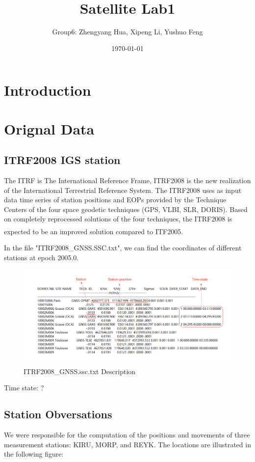 \documentclass{article}
\title{Satellite Lab1}
\author{Group6: Zhengyang Hua, Xipeng Li, Yushuo Feng}
\date{\today}
\newcommand{\upcite}[1]{\textsuperscript{\textsuperscript{\cite{#1}}}}
\begin{document}
\maketitle

\section{Introduction}


\section{Orignal Data}
\subsection{ITRF2008 IGS station}
The ITRF is The International Reference Frame, 
ITRF2008 is the new realization of the International Terrestrial Reference System. 
The ITRF2008 uses as input data time series of station positions and EOPs provided by the Technique Centers of the four space geodetic techniques (GPS, VLBI, SLR, DORIS). 
Based on completely reprocessed solutions of the four techniques, the ITRF2008 is expected to be an improved solution compared to ITF2005\upcite{ref1}.

In the file "ITRF2008\_GNSS.SSC.txt", we can find the coordinates of different stations at epoch 2005.0.
\begin{figure}[htbp]
    \centering
    \includegraphics[width=12cm]{./source/ITRF2008.png}
    \caption{ITRF2008\_GNSS.ssc.txt Description}
    \label{fig:ITRF2008}
\end{figure}

Time state: ?
\subsection{Station Obversations}
We were responsible for the computation of the positions and movements of three measurement stations: KIRU, MORP, and REYK. The locations are illustrated in the following figure:
\end{document}
